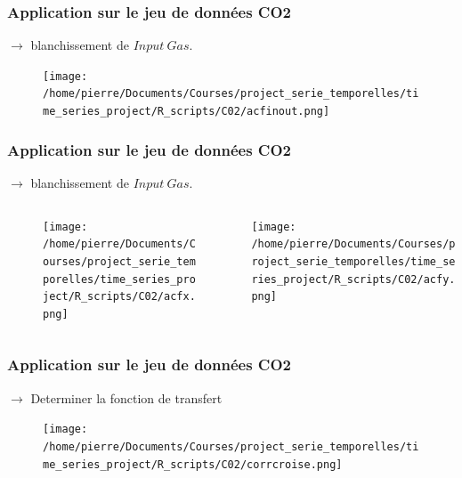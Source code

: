 \documentclass{presentation_template}
\begin{document}
\begin{frame}[fragile]
  \frametitle{Application sur le jeu de données CO2}
  $\rightarrow$ blanchissement de $Input\ Gas$.\\
  \begin{figure}
    \texttt{[image: /home/pierre/Documents/Courses/project\_serie\_temporelles/time\_series\_project/R\_scripts/C02/acfinout.png]} 
  \end{figure}
\end{frame}
\begin{frame}[fragile]
  \frametitle{Application sur le jeu de données CO2}
  $\rightarrow$ blanchissement de $Input\ Gas$.\\
  \begin{columns}
    \begin{column}{0.5\textwidth}
      \begin{figure}
        \texttt{[image: /home/pierre/Documents/Courses/project\_serie\_temporelles/time\_series\_project/R\_scripts/C02/acfx.png]} 
      \end{figure}
    \end{column}
    \begin{column}{0.5\textwidth}
      \texttt{[image: /home/pierre/Documents/Courses/project\_serie\_temporelles/time\_series\_project/R\_scripts/C02/acfy.png]} 
    \end{column}
  \end{columns}
\end{frame}
\begin{frame}[fragile]
  \frametitle{Application sur le jeu de données CO2}
  $\rightarrow$ Determiner la fonction de transfert\\
  \begin{figure}
    \texttt{[image: /home/pierre/Documents/Courses/project\_serie\_temporelles/time\_series\_project/R\_scripts/C02/corrcroise.png]} 
  \end{figure}
\end{frame}
\end{document}
